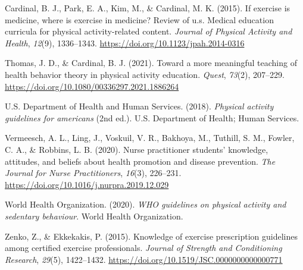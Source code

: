 \documentclass[
  jou,
  longtable,
  nolmodern,
  notxfonts,
  notimes,
  colorlinks=true,linkcolor=blue,citecolor=blue,urlcolor=blue,
  jou]{apa7}
\newlength{\cslhangindent}
\newenvironment{CSLReferences}[2] %
 {\begin{list}{}{%
  \setlength{\itemindent}{0pt}
  \setlength{\leftmargin}{0pt}
  \setlength{\parsep}{0pt}
  \ifodd #1
   \setlength{\leftmargin}{\cslhangindent}
   \setlength{\itemindent}{-1\cslhangindent}
  \fi
  \setlength{\itemsep}{#2\baselineskip}}}
 {\end{list}}
\begin{document}
\label{refs}
\begin{CSLReferences}{1}{0}
Cardinal, B. J., Park, E. A., Kim, M., \& Cardinal, M. K. (2015). If
exercise is medicine, where is exercise in medicine? Review of u.s.
Medical education curricula for physical activity-related content.
\emph{Journal of Physical Activity and Health}, \emph{12}(9),
1336--1343. \url{https://doi.org/10.1123/jpah.2014-0316}

Thomas, J. D., \& Cardinal, B. J. (2021). Toward a more meaningful
teaching of health behavior theory in physical activity education.
\emph{Quest}, \emph{73}(2), 207--229.
\url{https://doi.org/10.1080/00336297.2021.1886264}

U.S. Department of Health and Human Services. (2018). \emph{Physical
activity guidelines for americans} (2nd ed.). U.S. Department of Health;
Human Services.

Vermeesch, A. L., Ling, J., Voskuil, V. R., Bakhoya, M., Tuthill, S. M.,
Fowler, C. A., \& Robbins, L. B. (2020). Nurse practitioner students'
knowledge, attitudes, and beliefs about health promotion and disease
prevention. \emph{The Journal for Nurse Practitioners}, \emph{16}(3),
226--231. \url{https://doi.org/10.1016/j.nurpra.2019.12.029}

World Health Organization. (2020). \emph{WHO guidelines on physical
activity and sedentary behaviour}. World Health Organization.

Zenko, Z., \& Ekkekakis, P. (2015). Knowledge of exercise prescription
guidelines among certified exercise professionals. \emph{Journal of
Strength and Conditioning Research}, \emph{29}(5), 1422--1432.
\url{https://doi.org/10.1519/JSC.0000000000000771}

\end{CSLReferences}
\end{document}
